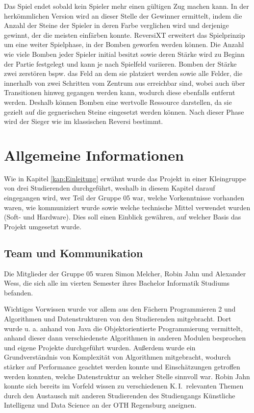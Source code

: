 \documentclass[12pt,a4paper,bibliography=totocnumbered,listof=totocnumbered]{article}
\begin{document}
Das Spiel endet sobald kein Spieler mehr einen gültigen Zug machen kann. In der herkömmlichen Version wird an dieser Stelle der Gewinner ermittelt, indem die Anzahl der Steine der Spieler in deren Farbe verglichen wird und derjenige gewinnt, der die meisten einfärben konnte. ReversiXT erweitert das Spielprinzip um eine weiter Spielphase, in der Bomben geworfen werden können. Die Anzahl wie viele Bomben jeder Spieler initial besitzt sowie deren Stärke wird zu Beginn der Partie festgelegt und kann je nach Spielfeld variieren. Bomben der Stärke zwei zerstören bspw. das Feld an dem sie platziert werden sowie alle Felder, die innerhalb von zwei Schritten vom Zentrum aus erreichbar sind, wobei auch über Transitionen hinweg gegangen werden kann, wodurch diese ebenfalls entfernt werden. Deshalb können Bomben eine wertvolle Ressource darstellen, da sie gezielt auf die gegnerischen Steine eingesetzt werden können. Nach dieser Phase wird der Sieger wie im klassischen Reversi bestimmt.


\newpage
\section{Allgemeine Informationen}
Wie in Kapitel \ref{kap:Einleitung} erwähnt wurde das Projekt in einer Kleingruppe von drei Studierenden durchgeführt, weshalb in diesem Kapitel darauf eingegangen wird, wer Teil der Gruppe 05 war, welche Vorkenntnisse vorhanden waren, wie kommuniziert wurde sowie welche technische Mittel verwendet wurden (Soft- und Hardware). Dies soll einen Einblick gewähren, auf welcher Basis das Projekt umgesetzt wurde.

\subsection{Team und Kommunikation}
Die Mitglieder der Gruppe 05 waren Simon Melcher, Robin Jahn und Alexander Wess, die sich alle im vierten Semester ihres Bachelor Informatik Studiums befanden.

Wichtiges Vorwissen wurde vor allem aus den Fächern Programmieren 2 und Algorithmen und Datenstrukturen von den Studierenden mitgebracht. Dort wurde u. a. anhand von Java die Objektorientierte Programmierung vermittelt, anhand dieser dann verschiedenste Algorithmen in anderen Modulen besprochen und eigene Projekte durchgeführt wurden. Außerdem wurde ein Grundverständnis von Komplexität von Algorithmen mitgebracht, wodurch stärker auf Performance geachtet werden konnte und Einschätzungen getroffen werden konnten, welche Datenstruktur an welcher Stelle sinnvoll war. Robin Jahn konnte sich bereits im Vorfeld wissen zu verschiedenen K.\,I.\ relevanten Themen durch den Austausch mit anderen Studierenden des Studiengangs \glqq Künstliche Intelligenz und Data Science\grqq{} an der OTH Regensburg aneignen.
\end{document}
